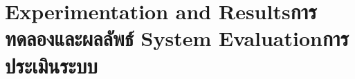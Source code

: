 \chapter{\ifproject%
      \ifenglish Experimentation and Results\else การทดลองและผลลัพธ์\fi
  \else%
      \ifenglish System Evaluation\else การประเมินระบบ\fi
  \fi}




